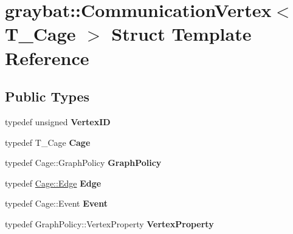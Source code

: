 \hypertarget{structgraybat_1_1CommunicationVertex}{}\section{graybat\+:\+:Communication\+Vertex$<$ T\+\_\+\+Cage $>$ Struct Template Reference}
\label{structgraybat_1_1CommunicationVertex}
\subsection*{Public Types}
\begin{DoxyCompactItemize}
\item 
\hypertarget{structgraybat_1_1CommunicationVertex_aeee40c9512c61c846a05c2b73f55f2c9}{}typedef unsigned {\bfseries Vertex\+I\+D}\label{structgraybat_1_1CommunicationVertex_aeee40c9512c61c846a05c2b73f55f2c9}

\item 
\hypertarget{structgraybat_1_1CommunicationVertex_a4120bf81952878038cfd69e92265267e}{}typedef T\+\_\+\+Cage {\bfseries Cage}\label{structgraybat_1_1CommunicationVertex_a4120bf81952878038cfd69e92265267e}

\item 
\hypertarget{structgraybat_1_1CommunicationVertex_a8c259ebf87eaefc4c9a18852d5382475}{}typedef Cage\+::\+Graph\+Policy {\bfseries Graph\+Policy}\label{structgraybat_1_1CommunicationVertex_a8c259ebf87eaefc4c9a18852d5382475}

\item 
\hypertarget{structgraybat_1_1CommunicationVertex_abe1383c4d00cea45c02e871433e8612f}{}typedef \hyperlink{structgraybat_1_1CommunicationEdge}{Cage\+::\+Edge} {\bfseries Edge}\label{structgraybat_1_1CommunicationVertex_abe1383c4d00cea45c02e871433e8612f}

\item 
\hypertarget{structgraybat_1_1CommunicationVertex_ab1153fcb89c4d288da7e430baf587a52}{}typedef Cage\+::\+Event {\bfseries Event}\label{structgraybat_1_1CommunicationVertex_ab1153fcb89c4d288da7e430baf587a52}

\item 
\hypertarget{structgraybat_1_1CommunicationVertex_abe4165d0c7c7f813a959f2009015d51c}{}typedef Graph\+Policy\+::\+Vertex\+Property {\bfseries Vertex\+Property}\label{structgraybat_1_1CommunicationVertex_abe4165d0c7c7f813a959f2009015d51c}

\end{DoxyCompactItemize}
